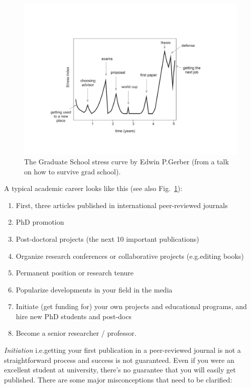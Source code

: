 \documentclass[graybox,envcountchap,sectrefs,UStrade]{svmono}
\begin{document}
\begin{figure}[!htb]
\begin{center}
  \includegraphics[width=.85\textwidth]{Fig_stress_curve_PhD.pdf}
\caption{The Graduate School stress curve by Edwin P.\@ Gerber (from a talk on how to survive grad school).} \label{Fig:stress_curve_PhD}
\end{center}
\end{figure}

A typical academic career looks like this (see also Fig.\@~\ref{Fig:stress_curve_PhD}):

\begin{enumerate}
  \item First, three articles published in international peer-reviewed journals
  \item PhD promotion
  \item Post-doctoral projects (the next 10 important publications)
  \item Organize research conferences or collaborative projects (e.g.\@ editing books)
  \item Permanent position or research tenure
  \item Popularize developments in your field in the media
  \item Initiate (get funding for) your own projects and educational programs, and hire new PhD students and post-docs
  \item Become a senior researcher / professor.
\end{enumerate}

\emph{Initiation} i.e.\@ getting your first publication in a peer-reviewed journal is not a straightforward process and success is not guaranteed. Even if you were an excellent student at university, there's no guarantee that you will easily get published. There are some major misconceptions that need to be clarified:
\end{document}
